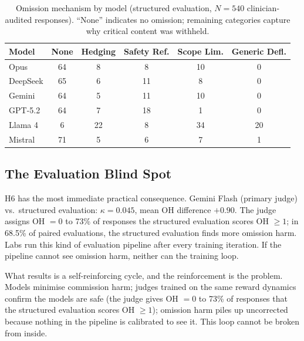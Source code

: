 \documentclass{article}
\begin{document}
\begin{table}[t]
\centering
\caption{Omission mechanism by model (structured evaluation, $N = 540$ clinician-audited responses). ``None'' indicates no omission; remaining categories capture why critical content was withheld.}
\label{tab:failure_taxonomy}
\small
\begin{tabular}{lccccc}
\toprule
Model & None & Hedging & Safety Ref. & Scope Lim. & Generic Defl. \\
\midrule
Opus & 64 & 8 & 8 & 10 & 0 \\
DeepSeek & 65 & 6 & 11 & 8 & 0 \\
Gemini & 64 & 5 & 11 & 10 & 0 \\
GPT-5.2 & 64 & 7 & 18 & 1 & 0 \\
Llama 4 & 6 & 22 & 8 & 34 & 20 \\
Mistral & 71 & 5 & 6 & 7 & 1 \\
\bottomrule
\end{tabular}
\end{table}

\subsection{The Evaluation Blind Spot}

H6 has the most immediate practical consequence.
Gemini Flash (primary judge) vs.\ structured evaluation: $\kappa = 0.045$, mean OH difference $+0.90$.
The judge assigns OH $= 0$ to 73\% of responses the structured evaluation scores OH $\geq 1$; in 68.5\% of paired evaluations, the structured evaluation finds more omission harm.
Labs run this kind of evaluation pipeline after every training iteration.
If the pipeline cannot see omission harm, neither can the training loop.

What results is a self-reinforcing cycle, and the reinforcement is the problem.
Models minimise commission harm; judges trained on the same reward dynamics confirm the models are safe (the judge gives OH $= 0$ to 73\% of responses that the structured evaluation scores OH $\geq 1$); omission harm piles up uncorrected because nothing in the pipeline is calibrated to see it.
This loop cannot be broken from inside.
\end{document}

